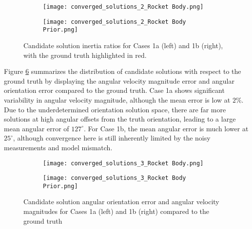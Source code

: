 \documentclass[a4paper,twocolumn]{spaceDebrisC} %
\begin{document}
\begin{figure}[H]
  \centering
  \begin{subfigure}[t]{0.23\textwidth}
    \centering
    \texttt{[image: converged\_solutions\_2\_Rocket Body.png]}
    \caption{}
    \label{fig:i_sols1a}
  \end{subfigure}
  \hfill
  \begin{subfigure}[t]{0.23\textwidth}
    \centering
    \texttt{[image: converged\_solutions\_2\_Rocket Body Prior.png]}
    \caption{}
    \label{fig:i_sols1b}
  \end{subfigure}
  \caption{Candidate solution inertia ratios for Cases 1a (left) and 1b (right), with the ground truth highlighted in red.}
  \label{fig:i_sols1}
\end{figure}

Figure \ref{fig:w_vs_ang_error_sols1} summarizes the distribution of candidate solutions with respect to the ground truth by displaying the angular velocity magnitude error and angular orientation error compared to the ground truth. Case 1a shows significant variability in angular velocity magnitude, although the mean error is low at $2\%$. Due to the underdetermined orientation solution space, there are far more solutions at high angular offsets from the truth orientation, leading to a large mean angular error of $127^\circ$. For Case 1b, the mean angular error is much lower at $25^\circ$, although convergence here is still inherently limited by the noisy measurements and model mismatch.

\begin{figure}[H]
  \centering
  \begin{subfigure}[t]{0.23\textwidth}
    \centering
    \texttt{[image: converged\_solutions\_3\_Rocket Body.png]}
    \caption{}
    \label{fig:w_vs_ang_error_sols1a}
  \end{subfigure}
  \hfill
  \begin{subfigure}[t]{0.23\textwidth}
    \centering
    \texttt{[image: converged\_solutions\_3\_Rocket Body Prior.png]}
    \caption{}
    \label{fig:w_vs_ang_error_sols1b}
  \end{subfigure}

  \caption{Candidate solution angular orientation error and angular velocity magnitudes for Cases 1a (left) and 1b (right) compared to the ground truth}
  \label{fig:w_vs_ang_error_sols1}
\end{figure}

\end{document}
